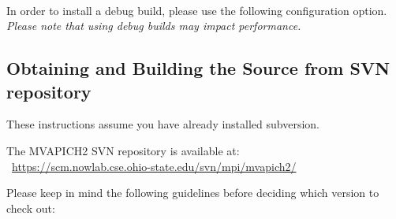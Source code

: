  \\

In order to install a debug build, please use the following
configuration option. \textit{Please note that using debug builds may impact
performance.}


\subsection{Obtaining and Building the Source from SVN repository}
These instructions assume you have already installed subversion.

The MVAPICH2 SVN repository is available at: \\
~\href{https://scm.nowlab.cse.ohio-state.edu/svn/mpi/mvapich2/}{https://scm.nowlab.cse.ohio-state.edu/svn/mpi/mvapich2/}

Please keep in mind the following guidelines before deciding which 
version to check out:

